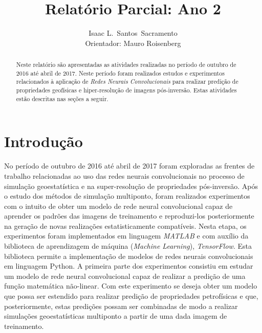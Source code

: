 \documentclass[11pt]{article}
\title{Relatório Parcial: Ano 2}
\author{Isaac L.\ Santos\ Sacramento \\ Orientador: Mauro Roisenberg}
\begin{document}
\lstset{language=C++,basicstyle=\small,
        stringstyle=\ttfamily,showstringspaces=false}

\singlespace
\maketitle

\begin{abstract}                %
Neste relatório são apresentadas as atividades realizadas no
período de outubro de 2016 até abril de 2017. Neste período foram realizados estudos e experimentos relacionados à aplicação
de \textit{Redes Neurais Convolucionais} para realizar predição de propriedades geofísicas e hiper-resolução de imagens pós-inversão.
Estas atividades estão descritas nas seções a seguir.

\end{abstract}

\doublespace
\setcounter{secnumdepth}{2}

\section{Introdução}

No período de outubro de 2016 até abril de 2017 foram exploradas as frentes de trabalho relacionadas ao uso
das redes neurais convolucionais no processo de simulação geoestatística e na super-resolução de propriedades pós-inversão.
Após o estudo dos métodos de simulação multiponto, foram realizados experimentos com o intuito de obter um modelo de rede neural convolucional
capaz de aprender os padrões das imagens de treinamento e reproduzi-los posteriormente na geração de novas realizações estatisticamente compatíveis.
Nesta etapa, os experimentos foram implementados em linguagem \textit{MATLAB} e com auxílio da biblioteca de aprendizagem de máquina (\textit{Machine Learning}),
\textit{TensorFlow}. Esta biblioteca permite a implementação de modelos de redes neurais convolucionais em linguagem Python. 
A primeira parte dos experimentos consistiu em estudar um modelo de rede neural convolucional
capaz de realizar a predição de uma função matemática não-linear. Com este experimento se deseja
obter um modelo que possa ser estendido para realizar predição de propriedades petrofísicas e que,
posteriormente, estas predições possam ser combinadas de modo a realizar simulações
geoestatísticas multiponto a partir de uma dada imagem de treinamento.
\end{document}
